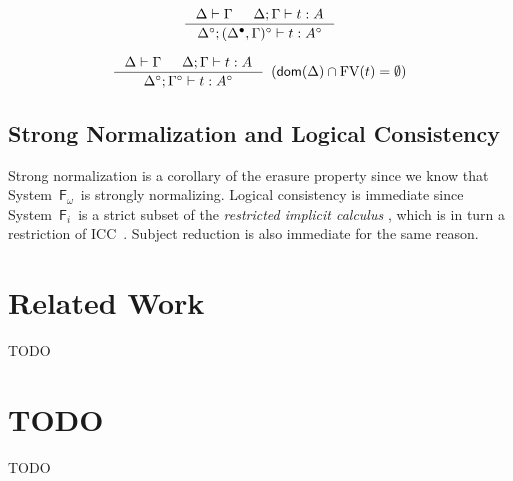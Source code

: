 \documentclass{llncs}
\newcommand{\Fi}{\ensuremath{\mathsf{F}_i}}
\newcommand{\Fw}{\ensuremath{\mathsf{F}_\omega}}
\newcommand{\dom}{\mathop{\mathsf{dom}}}
\newcommand{\FV}{\mathop{\mathrm{FV}}}
\begin{document}
\begin{theorem}
\label{thm:ierasetypingall}
\[ \inference{\Delta |- \Gamma & \Delta;\Gamma |- t : A}
		{\Delta^\circ;(\Delta^\bullet,\Gamma)^\circ |- t : A^\circ}
\]
\end{theorem}

\begin{corollary}
\label{thm:ierasetypingifree}
\[ \inference{ \Delta |- \Gamma & \Delta;\Gamma |- t : A}
		{\Delta^\circ;\Gamma^\circ |- t : A^\circ}
		{\enspace(\dom(\Delta)\cap\FV(t) = \emptyset)}
\]
\end{corollary}

\subsection{Strong Normalization and Logical Consistency} \label{ssec:sn}
Strong normalization is a corollary of the erasure property since we know that
System~\Fw\ is strongly normalizing. Logical consistency is immediate since
System~\Fi\ is a strict subset of the \emph{restricted implicit calculus}
\cite{Miquel00}, which is in turn a restriction of ICC~\cite{Miquel01}.
Subject reduction is also immediate for the same reason.

\section{Related Work} \label{sec:relwork}
TODO

\section{TODO}
TODO




\end{document}
